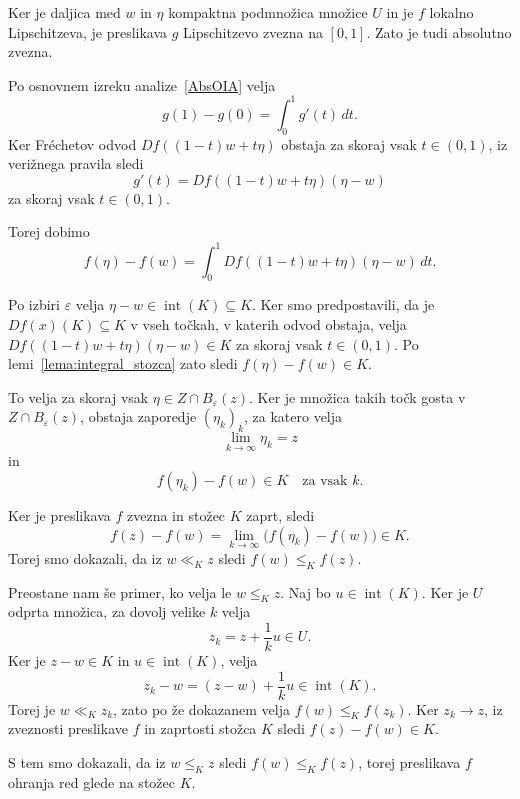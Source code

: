 \documentclass[mat2, tisk]{fmfdelo}
\begin{document}
\begin{dokaz}
Ker je daljica med $w$ in $\eta$
kompaktna podmnožica množice $U$
in je $f$ lokalno Lipschitzeva,
je preslikava $g$ Lipschitzevo zvezna
na $[0,1]$. Zato je tudi absolutno
zvezna.

Po osnovnem izreku analize~\ref{AbsOIA} velja
\[
g(1)-g(0)=\int_0^1 g'(t)\,dt.
\]
Ker Fréchetov odvod
$Df((1-t)w+t\eta)$ obstaja za skoraj
vsak $t\in(0,1)$, iz verižnega pravila
sledi
\[
g'(t)
=
Df((1-t)w+t\eta)(\eta-w)
\]
za skoraj vsak $t\in(0,1)$.

Torej dobimo
\[
f(\eta)-f(w)
=
\int_0^1
Df((1-t)w+t\eta)(\eta-w)\,dt.
\]

Po izbiri $\varepsilon$ velja
$\eta-w\in\operatorname{int}(K)\subseteq K$.
Ker smo predpostavili, da je 
$Df(x)(K)\subseteq K$ v vseh točkah,
v katerih odvod obstaja, velja $Df((1-t)w+t\eta)(\eta-w)\in K$
za skoraj vsak $t\in(0,1)$.
Po lemi~\ref{lema:integral_stozca} zato sledi
$f(\eta)-f(w)\in K$.

To velja za skoraj vsak
$\eta\in Z\cap B_\varepsilon(z)$.
Ker je množica takih točk gosta v
$Z\cap B_\varepsilon(z)$, obstaja
zaporedje $(\eta_k)_k$, za katero velja
\[
\lim_{k\to\infty}\eta_k=z
\]
in
\[
f(\eta_k)-f(w)\in K
\quad\text{za vsak }k.
\]

Ker je preslikava $f$ zvezna in
stožec $K$ zaprt, sledi
\[
f(z)-f(w)
=
\lim_{k\to\infty}
\bigl(f(\eta_k)-f(w)\bigr)\in K.
\]
Torej smo dokazali, da iz
$w\ll_K z$ sledi
$f(w)\leq_K f(z)$.

Preostane nam še primer, ko velja
le $w\leq_K z$.
Naj bo $u\in\operatorname{int}(K)$.
Ker je $U$ odprta množica, za dovolj
velike $k$ velja
\[
z_k=z+\frac{1}{k}u\in U.
\]
Ker je $z-w\in K$ in
$u\in\operatorname{int}(K)$, velja
\[
z_k-w=(z-w)+\frac{1}{k}u
\in\operatorname{int}(K).
\]
Torej je $w\ll_K z_k$, zato po že
dokazanem velja
$f(w)\leq_K f(z_k)$.
Ker $z_k\to z$, iz zveznosti
preslikave $f$ in zaprtosti stožca
$K$ sledi
$f(z)-f(w)\in K$.

S tem smo dokazali, da iz
$w\leq_K z$ sledi
$f(w)\leq_K f(z)$, torej preslikava
$f$ ohranja red glede na stožec $K$.
\end{dokaz}
\end{document}
